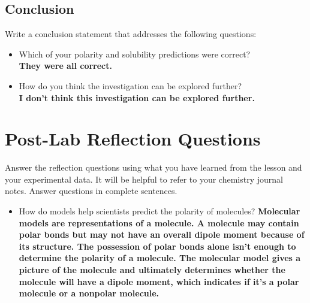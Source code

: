 \subsection{Conclusion}

Write a conclusion statement that addresses the following questions:

\begin{itemize}
  \item Which of your polarity and solubility predictions were correct? \\
    \bf{They were all correct. }
  \item How do you think the investigation can be explored further? \\
    \bf{I don’t think this investigation can be explored further.}
\end{itemize}

\section{Post-Lab Reflection Questions}

Answer the reflection questions using what you have learned from the lesson and
your experimental data. It will be helpful to refer to your chemistry journal
notes. Answer questions in complete sentences.

\begin{itemize}
  \item How do models help scientists predict the polarity of molecules?
    \bf{Molecular models are representations of a molecule. A molecule may
        contain polar bonds but may not have an overall dipole moment because of its
        structure. The possession of polar bonds alone isn’t enough to determine the
        polarity of a molecule. The molecular model gives a picture of the molecule and
        ultimately determines whether the molecule will have a dipole moment, which
        indicates if it’s a polar molecule or a nonpolar molecule.}
\end{itemize}
